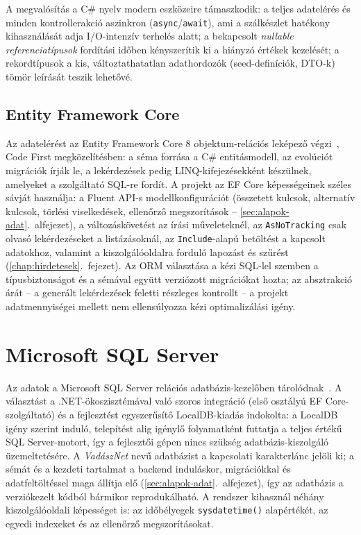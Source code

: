 A megvalósítás a C\# nyelv modern eszközeire támaszkodik: a teljes adatelérés és minden
kontrollerakció aszinkron (\texttt{async}/\texttt{await}), ami a szálkészlet hatékony
kihasználását adja I/O-intenzív terhelés alatt; a bekapcsolt \emph{nullable referenciatípusok}
fordítási időben kényszerítik ki a hiányzó értékek kezelését; a rekordtípusok a kis,
változtathatatlan adathordozók (seed-definíciók, DTO-k) tömör leírását teszik lehetővé.

\subsection{Entity Framework Core}

Az adatelérést az Entity Framework Core 8 objektum-relációs leképező
végzi~\cite{efcoredocs}, Code First megközelítésben: a séma forrása a C\# entitásmodell, az
evolúciót migrációk írják le, a lekérdezések pedig LINQ-kifejezésekként készülnek, amelyeket a
szolgáltató SQL-re fordít. A projekt az EF Core képességeinek széles sávját használja: a
Fluent API-s modellkonfigurációt (összetett kulcsok, alternatív kulcsok, törlési viselkedések,
ellenőrző megszorítások -- \ref{sec:alapok-adat}.~alfejezet), a változáskövetést az írási
műveleteknél, az \texttt{AsNoTracking} csak olvasó lekérdezéseket a listázásoknál, az
\texttt{Include}-alapú betöltést a kapcsolt adatokhoz, valamint a kiszolgálóoldalra forduló
lapozást és szűrést (\ref{chap:hirdetesek}.~fejezet). Az ORM választása a kézi SQL-lel szemben
a típusbiztonságot és a sémával együtt verziózott migrációkat hozta; az absztrakció árát --
a generált lekérdezések feletti részleges kontrollt -- a projekt adatmennyiségei mellett nem
ellensúlyozza kézi optimalizálási igény.

\section{Microsoft SQL Server}
\label{sec:tech-mssql}

Az adatok a Microsoft SQL Server relációs adatbázis-kezelőben
tárolódnak~\cite{sqlserverdocs}. A választást a .NET-ökoszisztémával való szoros integráció
(első osztályú EF Core-szolgáltató) és a fejlesztést egyszerűsítő LocalDB-kiadás indokolta: a
LocalDB igény szerint induló, telepítést alig igénylő folyamatként futtatja a teljes értékű
SQL Server-motort, így a fejlesztői gépen nincs szükség adatbázis-kiszolgáló üzemeltetésére. A
\emph{VadászNet} nevű adatbázist a kapcsolati karakterlánc jelöli ki; a sémát és a kezdeti
tartalmat a backend induláskor, migrációkkal és adatfeltöltéssel maga állítja elő
(\ref{sec:alapok-adat}.~alfejezet), így az adatbázis a verziókezelt kódból bármikor
reprodukálható. A rendszer kihasznál néhány kiszolgálóoldali képességet is: az időbélyegek
\texttt{sysdatetime()} alapértékét, az egyedi indexeket és az ellenőrző megszorításokat.

